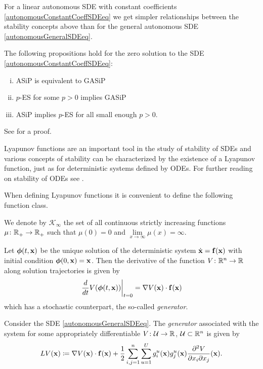 \documentclass[a4paper,12pt,twoside,BCOR=10mm]{scrbook}
\begin{document}
For a linear autonomous SDE with constant coefficients \eqref{autonomousConstantCoeffSDEeq} we get simpler relationships between the stability concepts above than for the general autonomous SDE \eqref{autonomousGeneralSDEeq}.

\begin{theorem}
    The following propositions hold for the zero solution to the SDE \eqref{autonomousConstantCoeffSDEeq}:
    
    \begin{enumerate}[i)]
        \item ASiP is equivalent to GASiP
        \item $p$-ES for some $p>0$ implies GASiP
        \item ASiP implies $p$-ES for all small enough $p>0$.
    \end{enumerate}
\end{theorem}

See \citep{HGGS2018localLya} for a proof.

Lyapunov functions are an important tool in the study of stability of SDEs and various concepts of stability can be characterized by the existence of a Lyapunov function, just as for deterministic systems defined by ODEs. For further reading on stability of ODEs see \citep{Hahn1967, vidya2002, Khalil1992, sastry1999}.

When defining Lyapunov functions it is convenient to define the following function class.

\begin{definition}
    We denote by $\mathcal{K}_\infty$ the set of all continuous strictly increasing functions $\mu\colon \mathbb{R}^{}_+ \to \mathbb{R}^{}_+$ such that $\mu(0) = 0$ and $\lim\limits_{x \to \infty} \mu(x) = \infty$.
\end{definition}

Let $\bm{\phi}(t,\mathbf{x})$ be the unique solution of the deterministic system $\Dot{\mathbf{x}} = \mathbf{f}(\mathbf{x})$ with initial condition $\bm{\phi}(0, \mathbf{x}) = \mathbf{x}$. Then the derivative of the function $V \colon \mathbb{R}^{n} \to \mathbb{R}^{}$ along solution trajectories is given by
\begin{align*}
    \left. \frac{d}{dt}V(\bm{\phi}(t,\mathbf{x}))\right\rvert_{t = 0} = \nabla V(\mathbf{x})\cdot \mathbf{f}(\mathbf{x})
\end{align*}
which has a stochastic counterpart, the so-called \textit{generator}.

\begin{definition}
    Consider the SDE \eqref{autonomousGeneralSDEeq}. The \textit{generator} associated with the system for some appropriately differentiable $V \colon \mathcal{U} \to \mathbb{R}^{}$, $\mathcal{U} \subset \mathbb{R}^{n}$ is given by
    \begin{align*}
        LV(\mathbf{x}) \coloneqq \nabla V(\mathbf{x})\cdot \mathbf{f}(\mathbf{x}) + \frac{1}{2}\sum\limits_{i,j = 1}^n\sum\limits_{u = 1}^U g_i^u(\mathbf{x}) g_j^u(\mathbf{x}) \frac{\partial^2 V}{\partial x_i \partial x_j}(\mathbf{x}).
    \end{align*}
\end{definition}
\end{document}
